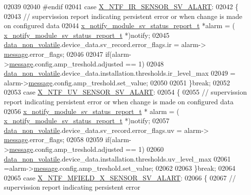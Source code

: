 \begin{DoxyCode}
02039 
02040 \textcolor{preprocessor}{#endif}
02041          \textcolor{keywordflow}{case}  \hyperlink{a00021_a0eb06525326cff5fc0fb38f141d6be8e}{X\_NTF\_IR\_SENSOR\_SV\_ALART}:
02042         \{
02043             \textcolor{comment}{// supervission report indicating persistent error or when change is made on configured data}
02044             \hyperlink{a00021_d7/d1b/a00864}{x\_notify\_module\_sv\_status\_report\_t} *alarm = (
      \hyperlink{a00021_d7/d1b/a00864}{x\_notify\_module\_sv\_status\_report\_t} *)notify;
02045             \hyperlink{a00060_a76ac5f917f5308dcd83de0d7c94559fb}{data\_non\_volatile}.device\_data.sv\_record.error\_flags.ir = alarm->
      \hyperlink{a00021_a13393a2d1589483b3bae4d2e79f43980}{message}.error\_flags;
02046 
02047             \textcolor{keywordflow}{if}(alarm->\hyperlink{a00021_a13393a2d1589483b3bae4d2e79f43980}{message}.config.amp\_treshold.adjusted == 1)
02048                 \hyperlink{a00060_a76ac5f917f5308dcd83de0d7c94559fb}{data\_non\_volatile}.device\_data.installation.thresholds.ir\_level\_max
02049                  = alarm->\hyperlink{a00021_a13393a2d1589483b3bae4d2e79f43980}{message}.config.amp\_treshold.set\_value;
02050 
02051         \}\textcolor{keywordflow}{break};
02052 
02053          \textcolor{keywordflow}{case}  \hyperlink{a00021_a146527c519502db561ac17015bf9df5b}{X\_NTF\_UV\_SENSOR\_SV\_ALART}:
02054         \{
02055             \textcolor{comment}{// supervission report indicating persistent error or when change is made on configured data}
02056             \hyperlink{a00021_d7/d1b/a00864}{x\_notify\_module\_sv\_status\_report\_t} * alarm = (
      \hyperlink{a00021_d7/d1b/a00864}{x\_notify\_module\_sv\_status\_report\_t} *)notify;
02057             \hyperlink{a00060_a76ac5f917f5308dcd83de0d7c94559fb}{data\_non\_volatile}.device\_data.sv\_record.error\_flags.uv = alarm->
      \hyperlink{a00021_a13393a2d1589483b3bae4d2e79f43980}{message}.error\_flags;
02058 
02059              \textcolor{keywordflow}{if}(alarm->\hyperlink{a00021_a13393a2d1589483b3bae4d2e79f43980}{message}.config.amp\_treshold.adjusted == 1)
02060                 \hyperlink{a00060_a76ac5f917f5308dcd83de0d7c94559fb}{data\_non\_volatile}.device\_data.installation.thresholds.uv\_level\_max
02061                  =alarm->\hyperlink{a00021_a13393a2d1589483b3bae4d2e79f43980}{message}.config.amp\_treshold.set\_value;
02062 
02063         \}\textcolor{keywordflow}{break};
02064 
02065         \textcolor{keywordflow}{case}  \hyperlink{a00021_a9d9558fb2155bafac3683d00b2a18b3f}{X\_NTF\_MFIELD\_X\_SENSOR\_SV\_ALART}:
02066         \{
02067             \textcolor{comment}{// supervission report indicating persistent error}

\end{DoxyCode}
